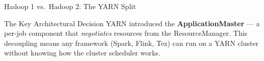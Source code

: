 \documentclass[aspectratio=169,10pt]{beamer}
\begin{document}
\begin{frame}{Hadoop 1 vs.\ Hadoop 2: The YARN Split}
\begin{center}
  \end{center}
  \vspace{2pt}
  \begin{alertblock}{The Key Architectural Decision}
    YARN introduced the \textbf{ApplicationMaster} — a per-job component that \emph{negotiates} resources from the ResourceManager.  This decoupling means any framework (Spark, Flink, Tez) can run on a YARN cluster without knowing how the cluster scheduler works.
  \end{alertblock}
\end{frame}
\end{document}
